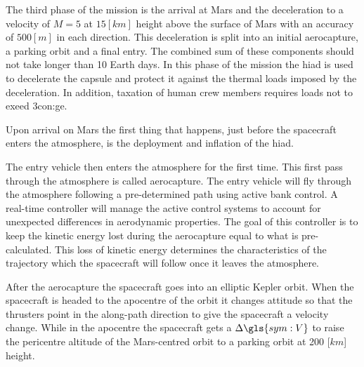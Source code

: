 The third phase of the mission is the arrival at Mars and the deceleration to a velocity of $M=5$ at $15 \left[km\right]$ height above the surface of Mars with an accuracy of $500 \left[m\right]$ in each direction. This deceleration is split into an initial aerocapture, a parking orbit and a final entry. The combined sum of these components should not take longer than 10 Earth days. In this phase of the mission the \gls{hiad} is used to decelerate the capsule and protect it against the thermal loads imposed by the deceleration. In addition, taxation of human crew members requires loads not to exeed 3\gls{con:ge}.

Upon arrival on Mars the first thing that happens, just before the spacecraft enters the atmosphere, is the deployment and inflation of the \gls{hiad}. %

The entry vehicle then enters the atmosphere for the first time. This first pass through the atmosphere is called aerocapture. The entry vehicle will fly through the atmosphere following a pre-determined path using active bank control. A real-time controller will manage the active control systems to account for unexpected differences in aerodynamic properties. The goal of this controller is to keep the kinetic energy lost during the aerocapture equal to what is pre-calculated. This loss of kinetic energy determines the characteristics of the trajectory which the spacecraft will follow once it leaves the atmosphere. %

After the aerocapture the spacecraft goes into an elliptic Kepler orbit. When the spacecraft is headed to the apocentre of the orbit it changes attitude so that the thrusters point in the along-path direction to give the spacecraft a velocity change. While in the apocentre the spacecraft gets a $\Delta\gls{sym:V}$ to raise the pericentre altitude of the Mars-centred orbit to a parking orbit at 200 [$km$] height.

